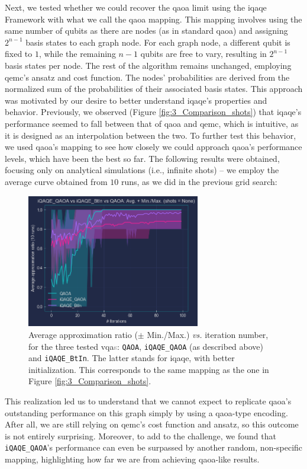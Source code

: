Next, we tested whether we could recover the \acrshort{qaoa} limit using the \acrshort{iqaqe} Framework with what we call the \acrshort{qaoa} mapping. This mapping involves using the same number of qubits as there are nodes (as in standard \acrshort{qaoa}) and assigning $2^{n-1}$ basis states to each graph node. For each graph node, a different qubit is fixed to $1$, while the remaining $n - 1$ qubits are free to vary, resulting in $2^{n-1}$ basis states per node. The rest of the algorithm remains unchanged, employing \acrshort{qemc}'s ansatz and cost function. The nodes' probabilities are derived from the normalized sum of the probabilities of their associated basis states. This approach was motivated by our desire to better understand \acrshort{iqaqe}'s properties and behavior. Previously, we observed (Figure \ref{fig:3_Comparison_shots}) that \acrshort{iqaqe}'s performance seemed to fall between that of \acrshort{qaoa} and \acrshort{qemc}, which is intuitive, as it is designed as an interpolation between the two. To further test this behavior, we used \acrshort{qaoa}'s mapping to see how closely we could approach \acrshort{qaoa}'s performance levels, which have been the best so far. The following results were obtained, focusing only on analytical simulations (i.e., infinite shots) – we employ the average curve obtained from $10$ runs, as we did in the previous grid search:
\vspace{-2.5mm}
\begin{figure}[H]
  \centering
  \includegraphics[width=0.675\textwidth]{Figures/Chapter_5/iQAQE_QAOA.png}
  \caption{Average approximation ratio ($\pm$ Min./Max.) \textit{vs.} iteration number, for the three tested \acrshort{vqa}\textcolor{gray}{s}: \texttt{QAOA}, \texttt{iQAQE\_QAOA} (as described above) and \texttt{iQAQE\_BtIn}. The latter stands for \acrshort{iqaqe}, with better initialization. This corresponds to the same mapping as the one in Figure \ref{fig:3_Comparison_shots}.}
  \label{fig:iQAQE_QAOA}
\end{figure}
\vspace{-4.0mm}
This realization led us to understand that we cannot expect to replicate \acrshort{qaoa}'s outstanding performance on this graph simply by using a \acrshort{qaoa}-type encoding. After all, we are still relying on \acrshort{qemc}'s cost function and ansatz, so this outcome is not entirely surprising. Moreover, to add to the challenge, we found that \texttt{iQAQE\_QAOA}'s performance can even be surpassed by another random, non-specific mapping, highlighting how far we are from achieving \acrshort{qaoa}-like results.

